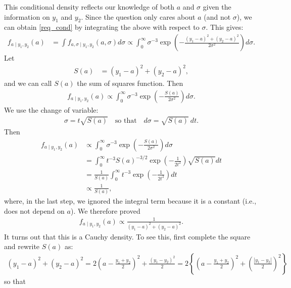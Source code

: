 \documentclass{scrartcl}
\begin{document}
This conditional density reflects our knowledge of both $a$ and
$\sigma$ given the information on $y_1$ and $y_2$. Since the question
only cares about $a$ (and not $\sigma$), we can obtain
\eqref{req_cond} by integrating the above with respect to
$\sigma$. This gives:
\begin{align*}
  f_{a \mid y_1, y_2}(a) &= \int f_{a, \sigma \mid y_1, y_2}(a, \sigma)
                           d\sigma \propto \int_0^{\infty} \sigma^{-3} \exp \left(-\frac{(y_1 - a)^2 + (y_2 - a)^2}{2
                           \sigma^2} \right) d \sigma.
\end{align*}
Let
\begin{align*}
  S(a) &= (y_1-a)^2+(y_2-a)^2, 
\end{align*}
and we can call $S(a)$ the sum of squares function. Then
\begin{align*}
  f_{a \mid y_1, y_2}(a) \propto \int_0^{\infty} \sigma^{-3} \exp \left(-\frac{S(a)}{2
                           \sigma^2} \right) d \sigma.
\end{align*}
We use the change of variable:
\begin{align}\label{cov}
  \sigma = t \sqrt{S(a)} ~~~ \text{ so that } ~~~ d \sigma =
  \sqrt{S(a)}~dt. 
\end{align}
Then
\begin{align*}
  f_{a \mid y_1, y_2}(a) &\propto \int_0^{\infty} \sigma^{-3} \exp \left(-\frac{S(a)}{2
                           \sigma^2} \right) d \sigma \\
  &= \int_0^{\infty} t^{-3} S(a)^{-3/2} \exp \left(-\frac{1}{2 t^2}
    \right) \sqrt{S(a)} dt \\
  &= \frac{1}{S(a)} \int_0^{\infty} t^{-3} \exp \left(-\frac{1}{2t^2}
    \right) dt \\
  &\propto \frac{1}{S(a)}, 
\end{align*}
where, in the last step, we ignored the integral term because it is a
constant (i.e., does not depend on $a$). We therefore proved
\begin{align*}
  f_{a\mid y_1,y_2}(a) \propto \frac{1}{(y_1-a)^2+(y_2-a)^2}.
\end{align*}
It turns out that this is a Cauchy density. To see this, first
complete the square and rewrite $S(a)$ as: 
\begin{align*}
  (y_1-a)^2+(y_2-a)^2
  =2\left(a-\frac{y_1+y_2}{2}\right)^2
    +\frac{(y_1-y_2)^2}{2} =2\left\{
    \left(a-\frac{y_1+y_2}{2}\right)^2
    +\left(\frac{|y_1-y_2|}{2}\right)^2
    \right\}
\end{align*}
so that
\end{document}
